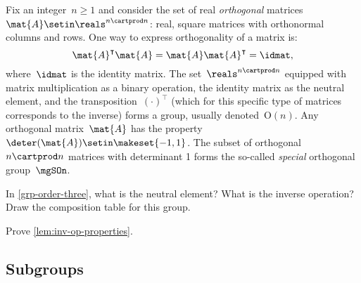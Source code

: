 \begin{example}

    Fix an integer~$n\geq 1$ and consider the set of real \emph{orthogonal} matrices~$\mat{A}\setin \reals^{n\cartprod n}$:
    real, square matrices with orthonormal columns and rows.
    One way to express orthogonality of a matrix is:
    \begin{equation}
        \mat{A}^\intercal \mat{A}=\mat{A}\mat{A}^\intercal = \idmat,
    \end{equation}
    where~$\idmat$ is the identity matrix.
    The set~$\reals^{n\cartprod n}$ equipped with matrix multiplication as a binary operation, the identity matrix as the neutral element, and the transposition~$(\cdot)^\intercal$ (which for this specific type of matrices corresponds to the inverse) forms a group, usually denoted~$\text{O}(n)$.
    Any orthogonal matrix~$\mat{A}$ has the property~$\deter(\mat{A})\setin \makeset{-1,1}$.
    The subset of orthogonal~$n\cartprod n$ matrices with determinant 1 forms the so-called \emph{special} orthogonal group~$\mgSOn$.
\end{example}

\vfill%

\begin{gradedexercise}
    \label{ex:GroupWithThreeElements}
    In \cref{grp-order-three}, what is the neutral element?
    What is the inverse operation?
    Draw the composition table for this group.
\end{gradedexercise}


\begin{gradedexercise}
    \label{ex:GroupInverseProperties}
    Prove \cref{lem:inv-op-properties}.
\end{gradedexercise}


\subsection{Subgroups}


